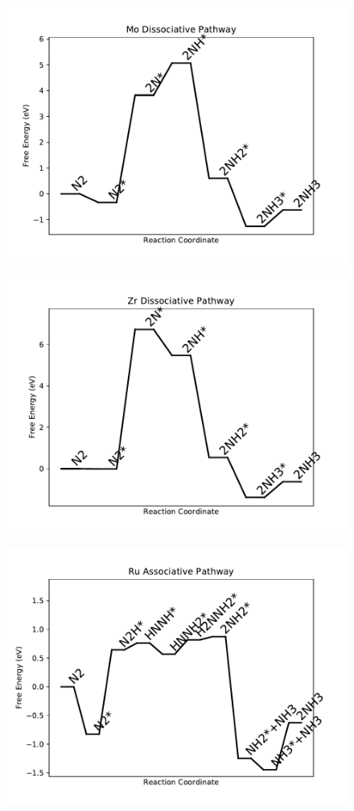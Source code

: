 \begin{figure}
\includegraphics[width=0.8\linewidth]{data/plots/Mo_dissociative.pdf}
\end{figure}

\begin{figure}
\includegraphics[width=0.8\linewidth]{data/plots/Zr_dissociative.pdf}
\end{figure}

\begin{figure}
\includegraphics[width=0.8\linewidth]{data/plots/Ru_associative.pdf}
\end{figure}

